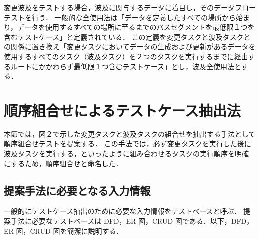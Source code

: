 \documentclass[a4paper,12pt]{jreport}
\begin{document}
変更波及をテストする場合，波及に関与するデータに着目し，そのデータフローテストを行う．
一般的な全使用法は「データを定義したすべての場所から始まり，データを使用するすべての場所に至るまでのパスセグメントを最低限１つを含むテストケース」と定義されている\cite{beiz90}．
この定義を変更タスクと波及タスクとの関係に置き換え「変更タスクにおいてデータの生成および更新があるデータを使用するすべてのタスク（波及タスク）を２つのタスクを実行するまでに経由するルートにかかわらず最低限１つ含むテストケース」とし，波及全使用法とする．


\section{順序組合せによるテストケース抽出法}

本節では，図２で示した変更タスクと波及タスクの組合せを抽出する手法として順序組合せテストを提案する．
この手法では，必ず変更タスクを実行した後に波及タスクを実行する，といったように組み合わせるタスクの実行順序を明確にするため，順序組合せと命名した．
\subsection{提案手法に必要となる入力情報}
 一般的にテストケース抽出のために必要な入力情報をテストベースと呼ぶ\cite{Demarco}．
提案手法に必要なテストベースは DFD，ER 図，CRUD 図である．以下，DFD，ER 図，CRUD 図を簡潔に説明する．
\end{document}
